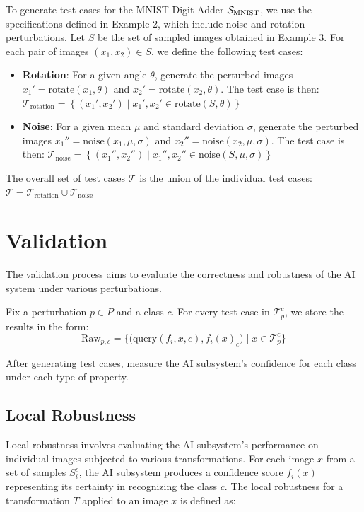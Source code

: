 \begin{example}
To generate test cases for the MNIST Digit Adder $\S_{\text{MNIST}}$, we use the specifications defined in Example 2, which include noise and rotation perturbations. Let $S$ be the set of sampled images obtained in Example 3. For each pair of images $(x_1, x_2) \in S$, we define the following test cases:
\begin{itemize}
    \item \textbf{Rotation}: For a given angle $\theta$, generate the perturbed images $x_1' = \text{rotate}(x_1, \theta)$ and $x_2' = \text{rotate}(x_2, \theta)$. The test case is then:
    $\mathcal{T}_{\text{rotation}} = \left\{(x_1', x_2') \mid x_1', x_2' \in \text{rotate}(S, \theta)\right\}$
    \item \textbf{Noise}: For a given mean $\mu$ and standard deviation $\sigma$, generate the perturbed images $x_1'' = \text{noise}(x_1, \mu, \sigma)$ and $x_2'' = \text{noise}(x_2, \mu, \sigma)$. The test case is then:
    $\mathcal{T}_{\text{noise}} = \left\{(x_1'', x_2'') \mid x_1'', x_2'' \in \text{noise}(S, \mu, \sigma)\right\}$
\end{itemize}
The overall set of test cases $\mathcal{T}$ is the union of the individual test cases:
$\mathcal{T} = \mathcal{T}_{\text{rotation}} \cup \mathcal{T}_{\text{noise}}$
\end{example}

\section{Validation}

The validation process aims to evaluate the correctness and robustness of the AI system under various perturbations.

Fix a perturbation \( p \in P \) and a class \( c \). For every test case in \( \mathcal{T}_p^c \), we store the results in the form:
\[ \text{Raw}_{p, c} = \Big\{\big(\text{query}(f_i, x, c), f_i(x)_c\big) \mid x \in \mathcal{T}_p^c \Big\} \]

After generating test cases, measure the AI subsystem's confidence for each class under each type of property.

\subsection{Local Robustness}

Local robustness involves evaluating the AI subsystem's performance on individual images subjected to various transformations. For each image \( x \) from a set of samples \( S_i^c \), the AI subsystem produces a confidence score \( f_i(x) \) representing its certainty in recognizing the class \( c \). The local robustness for a transformation \( T \) applied to an image \( x \) is defined as:

